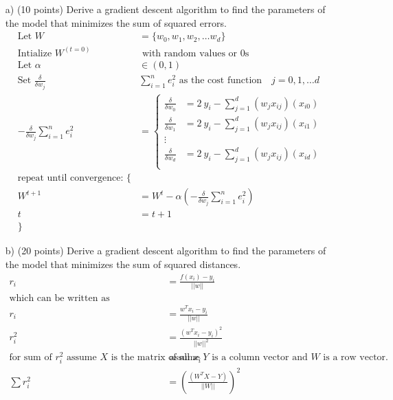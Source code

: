 \documentclass[a4 paper]{article}
\begin{document}
	\begin{enumerate}
	\item[a)] (10 points) Derive a gradient descent algorithm to find the parameters of the model that minimizes the sum of squared errors.
	\begin{equation*}
	\begin{split}
	\text{Let } W & = \{w_0, w_1, w_2, \dots w_d \} \\
	\text{Intialize } W^{(t=0)} & \text{ with random values or 0s} \\
	\text{Let } \alpha & \in (0 , 1) \\
	\text{Set } \frac{\delta}{\delta w_j} & \sum_{i=1}^n{e^2_i} \text{ as the cost function} \quad j = 0,1, \dots d\\
	-\frac{\delta}{\delta w_j} \sum_{i=1}^n{e^2_i} & = \begin{cases}
	\frac{\delta}{\delta w_0} & = 2 \ y_i - \sum_{j=1}^d(w_jx_{ij})(x_{i0}) \\
	\frac{\delta}{\delta w_1} & = 2 \ y_i -\sum_{j=1}^d(w_jx_{ij})(x_{i1}) \\
	\vdots \\
	\frac{\delta}{\delta w_d} & = 2 \ y_i - \sum_{j=1}^d(w_jx_{ij})(x_{id}) \\
	\end{cases} \\
	\text{repeat until convergence: \{} \\
	W^{t+1} & = W^{t} - \alpha(-\frac{\delta}{\delta w_j} \sum_{i=1}^n{e^2_i}) \\
	t & =  t + 1 \\ 
	\}
	\end{split}
	\end{equation*}
	\item[b)] (20 points) Derive a gradient descent algorithm to find the parameters of the model that minimizes the sum of squared distances.
	\begin{equation*}
	\begin{split}
		r_i &= \frac{f(x_i)-y_i}{||w||} \\
		\text{which can be written as} \\
		r_i &= \frac{w^Tx_i -y_i}{||w||} \\
		r_i^2  & = \frac{(w^Tx_i -y_i)^2}{||w||^2} \\
		\text{for sum of }r_i^2 \text{ assume } X \text{ is the matrix of all } x_i & \text{ assume } Y \text{ is a column vector and } W \text{ is a row vector.} \\
		 \sum r_i^2 & = (\frac{(W^TX -Y)}{||W||})^2 \\

\end{split}
\end{equation*}
\end{enumerate}
\end{document}
